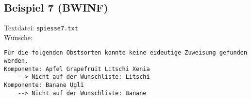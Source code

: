 \subsection{Beispiel 7 (BWINF)}\label{example:7}
Textdatei: \texttt{spiesse7.txt}\\

\noindent
Wünsche: \\
\vspace{7pt}

\noindent
{}
\begin{verbatim}
Für die folgenden Obstsorten konnte keine eideutige Zuweisung gefunden werden.
Komponente: Apfel Grapefruit Litschi Xenia 
	--> Nicht auf der Wunschliste: Litschi 
Komponente: Banane Ugli 
	--> Nicht auf der Wunschliste: Banane 
\end{verbatim}

